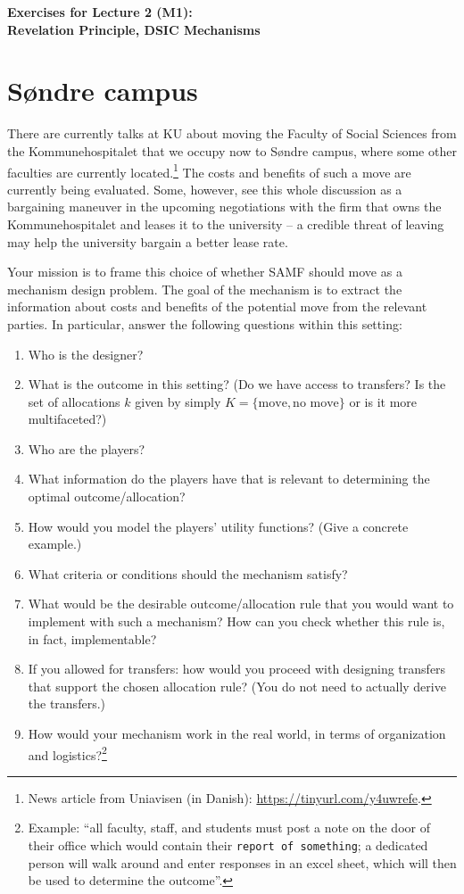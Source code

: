 \documentclass[a4paper]{article}
\begin{document}
\begin{center}
	\LARGE\textbf{Exercises for Lecture 2 (M1):\\ Revelation Principle, DSIC Mechanisms}
\end{center}



\section{S{\o}ndre campus}

There are currently talks at KU about moving the Faculty of Social Sciences from the Kommunehospitalet that we occupy now to S{\o}ndre campus, where some other faculties are currently located.\footnote{News article from Uniavisen (in Danish): \url{https://tinyurl.com/y4uwrefe}.}
The costs and benefits of such a move are currently being evaluated. Some, however, see this whole discussion as a bargaining maneuver in the upcoming negotiations with the firm that owns the Kommunehospitalet and leases it to the university -- a credible threat of leaving may help the university bargain a better lease rate.

Your mission is to frame this choice of whether SAMF should move as a mechanism design problem. The goal of the mechanism is to extract the information about costs and benefits of the potential move from the relevant parties. In particular, answer the following questions within this setting:

\begin{enumerate}
	\item Who is the designer?
	\item What is the outcome in this setting? (Do we have access to transfers? Is the set of allocations $k$ given by simply $K = \{\text{move},\text{no move}\}$ or is it more multifaceted?)
	\item Who are the players?
	\item What information do the players have that is relevant to determining the optimal outcome/allocation?
	\item How would you model the players' utility functions? (Give a concrete example.)
	\item What criteria or conditions should the mechanism satisfy? 
	\item What would be the desirable outcome/allocation rule that you would want to implement with such a mechanism? How can you check whether this rule is, in fact, implementable?
	\item If you allowed for transfers: how would you proceed with designing transfers that support the chosen allocation rule? (You do not need to actually derive the transfers.)
	\item How would your mechanism work in the real world, in terms of organization and logistics?\footnote{Example: ``all faculty, staff, and students must post a note on the door of their office which would contain their \texttt{report of something}; a dedicated person will walk around and enter responses in an excel sheet, which will then be used to determine the outcome''.}
\end{enumerate}
\end{document}
